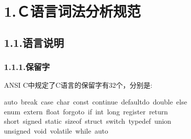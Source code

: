 \documentclass{article}
\begin{document}
\begin{mdtoc}
\begin{mdtocblock}

\begin{mdtocblock}%



\end{mdtocblock}%


\begin{mdtocblock}%


\end{mdtocblock}%
\end{mdtocblock}%
\end{mdtoc}%

\section{1.\hspace*{0.5em}Ｃ语言词法分析规范}\label{section}%

\subsection{1.1.\hspace*{0.5em}语言说明}\label{section}%

\subsubsection{1.1.1.\hspace*{0.5em}保留字}\label{section}%

\noindent{}ANSI C中规定了C语言的保留字有32个，分别是:%
\begin{mdpre}%
\noindent auto~break~case~char~const~continue~defaultdo~double~else~\\
enum~extern~float~forgoto~if~int~long~register~return~\\
short~signed~static~sizeof~struct~switch~typedef~union\\
unsigned~void~volatile~while~auto%
\end{mdpre}
\end{document}
